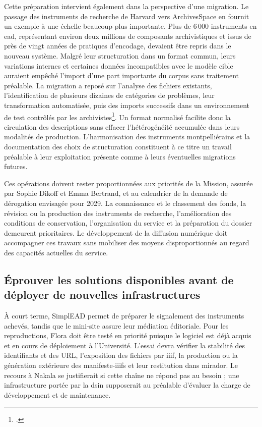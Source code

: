 Cette préparation intervient également dans la perspective d'une migration. Le passage des instruments de recherche de Harvard vers ArchivesSpace en fournit un exemple à une échelle beaucoup plus importante. Plus de 6\,000 instruments en \gls{ead}, représentant environ deux millions de composants archivistiques et issus de près de vingt années de pratiques d'encodage, devaient être repris dans le nouveau système. Malgré leur structuration dans un format commun, leurs variations internes et certaines données incompatibles avec le modèle cible auraient empêché l'import d'une part importante du corpus sans traitement préalable. La migration a reposé sur l'analyse des fichiers existants, l'identification de plusieurs dizaines de catégories de problèmes, leur transformation automatisée, puis des imports successifs dans un environnement de test contrôlés par les archivistes\footcite{MayoBowers2017}. Un format normalisé facilite donc la circulation des descriptions sans effacer l'hétérogénéité accumulée dans leurs modalités de production. L'harmonisation des instruments montpelliérains et la documentation des choix de structuration constituent à ce titre un travail préalable à leur exploitation présente comme à leurs éventuelles migrations futures.

Ces opérations doivent rester proportionnées aux priorités de la Mission, assurée par Sophie Dikoff et Emma Bertrand, et au calendrier de la demande de dérogation envisagée pour 2029. La connaissance et le classement des fonds, la révision ou la production des instruments de recherche, l'amélioration des conditions de conservation, l'organisation du service et la préparation du dossier demeurent prioritaires. Le développement de la diffusion numérique doit accompagner ces travaux sans mobiliser des moyens disproportionnés au regard des capacités actuelles du service.


\subsection{Éprouver les solutions disponibles avant de déployer de nouvelles infrastructures}

À court terme, SimplEAD permet de préparer le \gls{signalement} des instruments achevés, tandis que le mini-site assure leur médiation éditoriale. Pour les reproductions, Flora doit être testé en priorité puisque le logiciel est déjà acquis et en cours de déploiement à l'Université. L'essai devra vérifier la stabilité des identifiants et des URL, l'exposition des fichiers par \gls{iiif}, la production ou la génération extérieure des \glspl{manifeste-iiif} et leur restitution dans \gls{mirador}. Le recours à Nakala se justifierait si cette chaîne ne répond pas au besoin ; une infrastructure portée par la \gls{dsin} supposerait au préalable d'évaluer la charge de développement et de maintenance.

